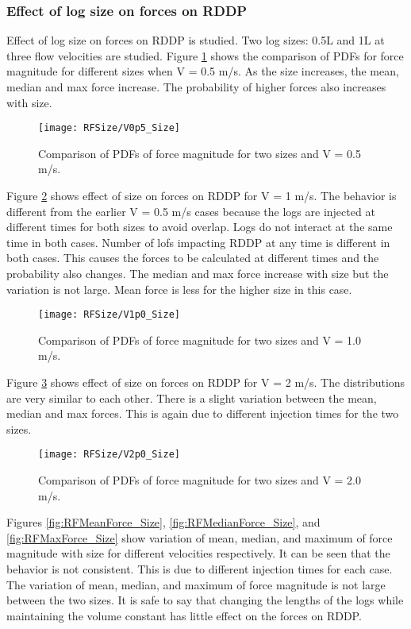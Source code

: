 \subsubsection{Effect of log size on forces on RDDP}
Effect of log size on forces on RDDP is studied. Two log sizes: 0.5L and 1L at three flow velocities are studied. Figure \ref{fig:RFSV0p5} shows the comparison of PDFs for force magnitude for different sizes when V = 0.5 m/s. As the size increases, the mean, median and max force increase. The probability of higher forces also increases with size. 

\begin{figure}
\centering
\texttt{[image: RFSize/V0p5\_Size]}
\caption{\label{fig:RFSV0p5}Comparison of PDFs of force magnitude for two sizes and V = 0.5 m/s.}
\end{figure} 

\noindent Figure \ref{fig:RFSV1p0} shows effect of size on forces on RDDP for V = 1 m/s. The behavior is different from the earlier V = 0.5 m/s cases because the logs are injected at different times for both sizes to avoid overlap. Logs do not interact at the same time in both cases. Number of lofs impacting RDDP at any time is different in both cases. This causes the forces to be calculated at different times and the probability also changes. The median and max force increase with size but the variation is not large. Mean force is less for the higher size in this case. 

\begin{figure}
\centering
\texttt{[image: RFSize/V1p0\_Size]}
\caption{\label{fig:RFSV1p0}Comparison of PDFs of force magnitude for two sizes and V = 1.0 m/s.}
\end{figure} 

\noindent Figure \ref{fig:RFSV2p0} shows effect of size on forces on RDDP for V = 2 m/s. The distributions are very similar to each other. There is a slight variation between the mean, median and max forces. This is again due to different injection times for the two sizes. 

\begin{figure}
\centering
\texttt{[image: RFSize/V2p0\_Size]}
\caption{\label{fig:RFSV2p0}Comparison of PDFs of force magnitude for two sizes and V = 2.0 m/s.}
\end{figure} 

\noindent Figures \ref{fig:RFMeanForce_Size}, \ref{fig:RFMedianForce_Size}, and \ref{fig:RFMaxForce_Size} show variation of mean, median, and maximum of force magnitude with size for different velocities respectively. It can be seen that the behavior is not consistent. This is due to different injection times for each case. The variation of mean, median, and maximum of force magnitude is not large between the two sizes. It is safe to say that changing the lengths of the logs while maintaining the volume constant has little effect on the forces on RDDP. 

